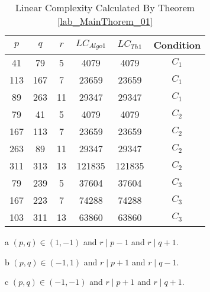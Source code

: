 \documentclass{mcom-l}
\theoremstyle{definition}
\numberwithin{equation}{section}
\begin{document}
      \begin{table}[!t]
         \begin{threeparttable}[t]
         \renewcommand{\arraystretch}{1.3}
         \caption{Linear Complexity Calculated By Theorem \ref{lab_MainThorem_01}}
         \label{Lab_Table2}
         \centering
         \begin{tabular}{c|c|c|c|c|c}
         \hline
        $ p $ & $ q $ & $ r $ & $ LC_{Algo1} $ & $ LC_{Th1} $ & \textbf{Condition}\\
         \hline
         41 & 79 & 5 & 4079 & 4079 & $ C_{1} $\tnote{a} \\
         \hline
         113 & 167 & 7 & 23659 & 23659 & $ C_{1} $ \\
         \hline
         89 & 263 & 11 & 29347 & 29347 & $ C_{1} $ \\
         \hline
         79 & 41 & 5 & 4079 & 4079 & $ C_{2} $\tnote{b} \\
         \hline
         167 & 113 & 7 & 23659 & 23659 & $ C_{2} $ \\
         \hline
         263 & 89 & 11 & 29347 & 29347 & $ C_{2} $ \\
         \hline
         311 & 313 & 13 & 121835 & 121835 & $ C_{2} $ \\
         \hline
         79 & 239 & 5 & 37604 & 37604 & $ C_{3} $\tnote{c} \\
         \hline
         167 & 223 & 7 & 74288 & 74288 & $ C_{3} $ \\
         \hline
         103 & 311 & 13 & 63860 & 63860 & $ C_{3} $ \\
         \hline
         \end{tabular}
         \begin{tablenotes}
         \item [a] $ (p,q)\in (1,-1) $ and $ r\mid p-1 $ and $ r\mid q+1 $.
         \item [b] $ (p,q)\in (-1,1) $ and $ r\mid p+1 $ and $ r\mid q-1 $.
         \item [c] $ (p,q)\in (-1,-1) $ and $ r\mid p+1 $ and $ r\mid q+1 $.
         \end{tablenotes}
         \end{threeparttable}
         \end{table}
\end{document}
